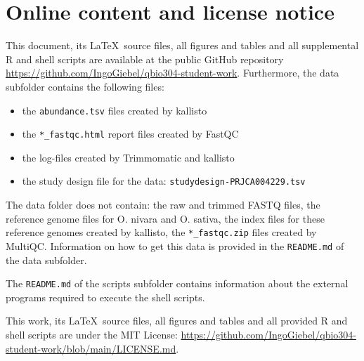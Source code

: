 \section{Online content and license notice}

This document, its \LaTeX\ source files, all figures and tables and all supplemental R and shell scripts are available at the public GitHub repository \url{https://github.com/IngoGiebel/qbio304-student-work}. Furthermore, the data subfolder contains the following files:
\begin{itemize}
    \item the \verb|abundance.tsv| files created by kallisto
    \item the \verb|*_fastqc.html| report files created by FastQC
    \item the log-files created by Trimmomatic and kallisto
    \item the study design file for the data: \verb|studydesign-PRJCA004229.tsv|
\end{itemize}
The data folder does not contain: the raw and trimmed FASTQ files, the reference genome files for O. nivara and O. sativa, the index files for these reference genomes created by kallisto, the \verb|*_fastqc.zip| files created by MultiQC. Information on how to get this data is provided in the \verb|README.md| of the data subfolder.

The \verb|README.md| of the scripts subfolder contains information about the external programs required to execute the shell scripts.

This work, its \LaTeX\ source files, all figures and tables and all provided R and shell scripts are under the MIT License: \url{https://github.com/IngoGiebel/qbio304-student-work/blob/main/LICENSE.md}.